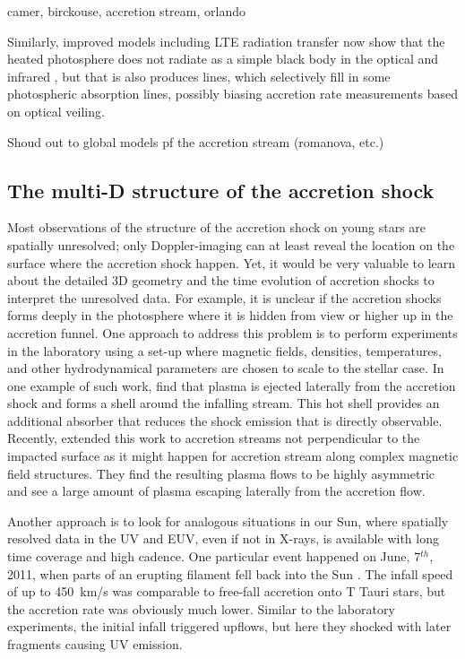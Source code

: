 \documentclass[graybox, nosecnum]{svmult}
\begin{document}
camer, birckouse, accretion stream, orlando

Similarly, improved models including LTE radiation transfer now show that the heated photosphere does not radiate as a simple black body in the optical and infrared \citep{Dodin_2012,Dodin_2013}, but that is also produces lines, which selectively fill in some photospheric absorption lines, possibly biasing accretion rate measurements based on optical veiling.

Shoud out to global models pf the accretion stream (romanova, etc.)

\subsection{The multi-D structure of the accretion shock}

Most observations of the structure of the accretion shock on young stars are spatially unresolved; only Doppler-imaging can at least reveal the location on the surface where the accretion shock happen. Yet, it would be very valuable to learn about the detailed 3D geometry and the time evolution of accretion shocks to interpret the unresolved data. For example, it is unclear if the accretion shocks forms deeply in the photosphere where it is hidden from view or higher up in the accretion funnel. One approach to address this problem is to perform experiments in the laboratory using a set-up where magnetic fields, densities, temperatures, and other hydrodynamical parameters are chosen to scale to the stellar case. In one example of such work, \citet{2017SciA....3E0982R} find that plasma is ejected laterally from the accretion shock and forms a shell around the infalling stream. This hot shell provides an additional absorber that reduces the shock emission that is directly observable. Recently, \citet{2020A&A...642A..38B} extended this work to accretion streams not perpendicular to the impacted surface as it might happen for accretion stream along complex magnetic field structures. They find the resulting plasma flows to be highly asymmetric and see a large amount of plasma escaping laterally from the accretion flow.  

Another approach is to look for analogous situations in our Sun, where spatially resolved data in the UV and EUV, even if not in X-rays, is available with long time coverage and high cadence. One particular event happened on June, 7$^{th}$, 2011, when parts of an erupting filament fell back into the Sun \citep{2013Sci...341..251R,2013A&A...559A.127O}. The infall speed of up to 450~km/s was comparable to free-fall accretion onto T Tauri stars, but the accretion rate was obviously much lower. Similar to the laboratory experiments, the initial infall triggered upflows, but here they shocked with later fragments causing UV emission.
\end{document}
